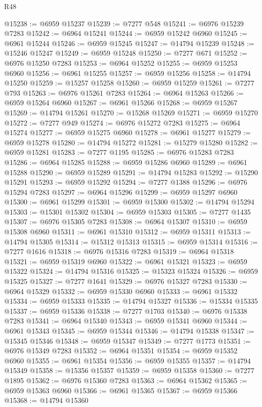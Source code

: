 \begin{lexlean}{R48}
\begin{coremodule}
@15238 := @6959 @15237
@15239 := @7277 @548
@15241 := @6976 @15239 @7283
@15242 := @6964 @15241
@15244 := @6959 @15242 @6960
@15245 := @6961 @15244
@15246 := @6959 @15245
@15247 := @14794 @15239
@15248 := @15246 @15247
@15249 := @6959 @15248
@15250 := @7277 @671
@15252 := @6976 @15250 @7283
@15253 := @6964 @15252
@15255 := @6959 @15253 @6960
@15256 := @6961 @15255
@15257 := @6959 @15256
@15258 := @14794 @15250
@15259 := @15257 @15258
@15260 := @6959 @15259
@15261 := @7277 @793
@15263 := @6976 @15261 @7283
@15264 := @6964 @15263
@15266 := @6959 @15264 @6960
@15267 := @6961 @15266
@15268 := @6959 @15267
@15269 := @14794 @15261
@15270 := @15268 @15269
@15271 := @6959 @15270
@15272 := @7277 @949
@15274 := @6976 @15272 @7283
@15275 := @6964 @15274
@15277 := @6959 @15275 @6960
@15278 := @6961 @15277
@15279 := @6959 @15278
@15280 := @14794 @15272
@15281 := @15279 @15280
@15282 := @6959 @15281
@15283 := @7277 @1195
@15285 := @6976 @15283 @7283
@15286 := @6964 @15285
@15288 := @6959 @15286 @6960
@15289 := @6961 @15288
@15290 := @6959 @15289
@15291 := @14794 @15283
@15292 := @15290 @15291
@15293 := @6959 @15292
@15294 := @7277 @1388
@15296 := @6976 @15294 @7283
@15297 := @6964 @15296
@15299 := @6959 @15297 @6960
@15300 := @6961 @15299
@15301 := @6959 @15300
@15302 := @14794 @15294
@15303 := @15301 @15302
@15304 := @6959 @15303
@15305 := @7277 @1435
@15307 := @6976 @15305 @7283
@15308 := @6964 @15307
@15310 := @6959 @15308 @6960
@15311 := @6961 @15310
@15312 := @6959 @15311
@15313 := @14794 @15305
@15314 := @15312 @15313
@15315 := @6959 @15314
@15316 := @7277 @1616
@15318 := @6976 @15316 @7283
@15319 := @6964 @15318
@15321 := @6959 @15319 @6960
@15322 := @6961 @15321
@15323 := @6959 @15322
@15324 := @14794 @15316
@15325 := @15323 @15324
@15326 := @6959 @15325
@15327 := @7277 @1641
@15329 := @6976 @15327 @7283
@15330 := @6964 @15329
@15332 := @6959 @15330 @6960
@15333 := @6961 @15332
@15334 := @6959 @15333
@15335 := @14794 @15327
@15336 := @15334 @15335
@15337 := @6959 @15336
@15338 := @7277 @1703
@15340 := @6976 @15338 @7283
@15341 := @6964 @15340
@15343 := @6959 @15341 @6960
@15344 := @6961 @15343
@15345 := @6959 @15344
@15346 := @14794 @15338
@15347 := @15345 @15346
@15348 := @6959 @15347
@15349 := @7277 @1773
@15351 := @6976 @15349 @7283
@15352 := @6964 @15351
@15354 := @6959 @15352 @6960
@15355 := @6961 @15354
@15356 := @6959 @15355
@15357 := @14794 @15349
@15358 := @15356 @15357
@15359 := @6959 @15358
@15360 := @7277 @1895
@15362 := @6976 @15360 @7283
@15363 := @6964 @15362
@15365 := @6959 @15363 @6960
@15366 := @6961 @15365
@15367 := @6959 @15366
@15368 := @14794 @15360

\end{coremodule}
\end{lexlean}
